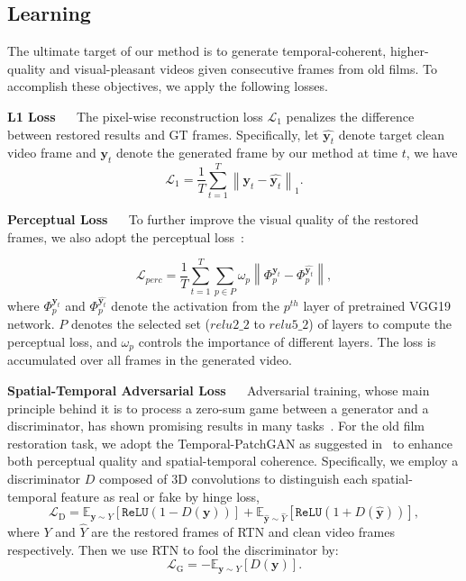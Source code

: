 \documentclass[10pt,twocolumn,letterpaper]{article}
\begin{document}
	\subsection{Learning}\label{sec3.4}
	
	The ultimate target of our method is to generate temporal-coherent, higher-quality and visual-pleasant videos given consecutive frames from old films. To accomplish these objectives, we apply the following losses.
	
	\noindent\textbf{L1 Loss}  ~~ The pixel-wise reconstruction loss $\mathcal{L}_{{1}}$ penalizes the difference between restored results and GT frames. Specifically, let $\hat{\mathbf{y}_{t}}$ denote target clean video frame and $\mathbf{y}_{t}$ denote the generated frame by our method at time $t$, we have
	\begin{equation}
	\mathcal{L}_{{1}}=\frac{1}{T} \sum_{t=1}^{T} \left\|\mathbf{y}_{t}-\hat{\mathbf{y}_{t}}\right\|_{1}.
	\end{equation}
	
	
	\noindent\textbf{Perceptual Loss} ~~  To further improve the visual quality of the restored frames, we also adopt the perceptual loss~\cite{johnson2016perceptual}:
	
	\begin{equation}
	\mathcal{L}_{perc}=\frac{1}{T}\sum_{t=1}^{T} \sum_{p \in P}\omega_{p} \left\|\Phi_{p}^{\mathbf{y}_{t}}-\Phi_{p}^{\hat{\mathbf{y}_{t}}}\right\|,
	\end{equation}
	where $\Phi_{p}^{\mathbf{y}_{t}}$ and $\Phi_{p}^{\hat{\mathbf{y}_{t}}}$ denote the activation from the $p^{th}$ layer of pretrained VGG19 network. $P$ denotes the selected set ($relu2\_2$ to $relu5\_2$) of layers to compute the perceptual loss, and $\omega_{p}$ controls the importance of different layers. The loss is accumulated over all frames in the generated video.
	

	\noindent\textbf{Spatial-Temporal Adversarial Loss}  ~~  Adversarial training, whose main principle behind it is to process a zero-sum game between a generator and a discriminator, has shown promising results in many tasks~\cite{goodfellow2014generative,wan2020bringing}. For the old film restoration task, we adopt the Temporal-PatchGAN as suggested in~\cite{chang2019free} to enhance both perceptual quality and spatial-temporal coherence. Specifically, we employ a discriminator $D$ composed of 3D convolutions to distinguish each spatial-temporal feature as real or fake by hinge loss,
	\begin{equation}
	\mathcal{L}_{\mathrm{D}}=\mathbb{E}_{\mathbf{y} \sim Y}[ \mathtt{ReLU}({1}-D(\mathbf{y}))]+\mathbb{E}_{\hat{\mathbf{y}} \sim \hat{Y}}\left[\mathtt{ReLU}\left( {1}+D(\hat{\mathbf{y}})\right)\right],
	\end{equation}
	where $Y$ and $\hat{Y}$ are the restored frames of RTN and clean video frames respectively. Then we use RTN to fool the discriminator by:
	\begin{equation}
	\mathcal{L}_{\mathrm{G}}=-\mathbb{E}_{\mathbf{y} \sim Y}[D(\mathbf{y})].
	\end{equation}
	
\end{document}
